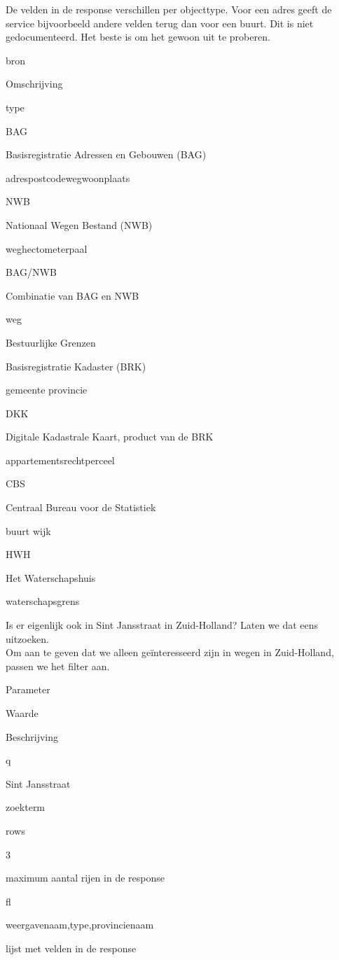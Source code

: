 \documentclass[]{book}
\begin{document}
De velden in de response verschillen per objecttype. Voor een adres geeft de service bijvoorbeeld andere velden terug dan voor een buurt. Dit is niet gedocumenteerd. Het beste is om het gewoon uit te proberen.

{bron}

Omschrijving

{type}

{BAG}

Basisregistratie Adressen en Gebouwen (BAG)

{adrespostcodewegwoonplaats}

{NWB}

Nationaal Wegen Bestand (NWB)

{weghectometerpaal}

{BAG/NWB}

Combinatie van BAG en NWB

{weg}

{Bestuurlijke Grenzen}

Basisregistratie Kadaster (BRK)

{gemeente provincie}

{DKK}

Digitale Kadastrale Kaart, product van de BRK

{appartementsrechtperceel}

{CBS}

Centraal Bureau voor de Statistiek

{buurt wijk}

{HWH}

Het Waterschapshuis

{waterschapsgrens}

Is er eigenlijk ook in Sint Jansstraat in Zuid-Holland? Laten we dat eens uitzoeken.\\
Om aan te geven dat we alleen geïnteresseerd zijn in wegen in Zuid-Holland, passen we het filter aan.

Parameter

Waarde

Beschrijving

{q}

{Sint Jansstraat}

zoekterm

{rows}

{3}

maximum aantal rijen in de response

{fl}

{weergavenaam,type,provincienaam}

lijst met velden in de response
\end{document}

